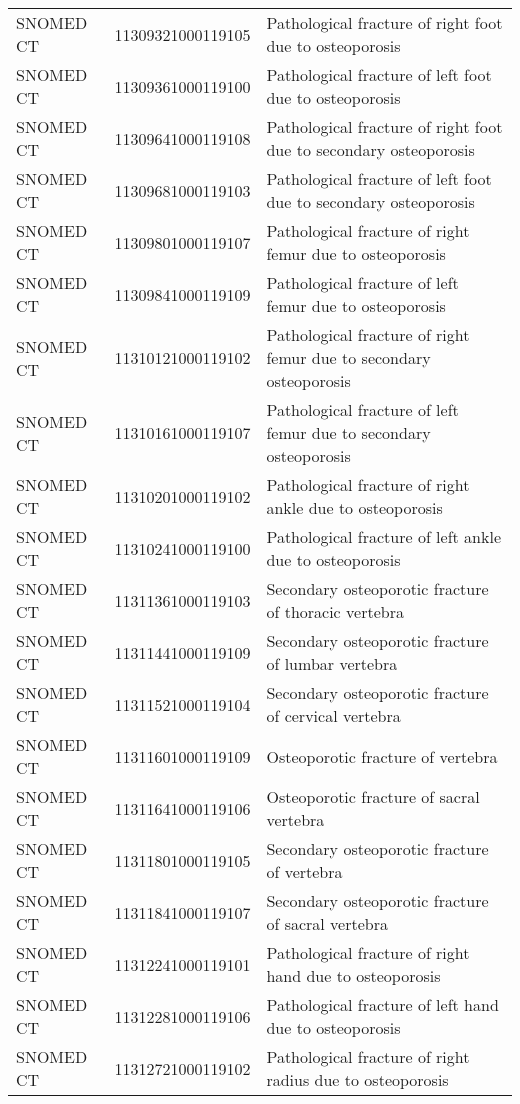 \begin{longtable}{p{}p{}p{}}
  SNOMED CT & 11309321000119105 & Pathological fracture of right foot due to osteoporosis \\ 
  SNOMED CT & 11309361000119100 & Pathological fracture of left foot due to osteoporosis \\ 
  SNOMED CT & 11309641000119108 & Pathological fracture of right foot due to secondary osteoporosis \\ 
  SNOMED CT & 11309681000119103 & Pathological fracture of left foot due to secondary osteoporosis \\ 
  SNOMED CT & 11309801000119107 & Pathological fracture of right femur due to osteoporosis \\ 
  SNOMED CT & 11309841000119109 & Pathological fracture of left femur due to osteoporosis \\ 
  SNOMED CT & 11310121000119102 & Pathological fracture of right femur due to secondary osteoporosis \\ 
  SNOMED CT & 11310161000119107 & Pathological fracture of left femur due to secondary osteoporosis \\ 
  SNOMED CT & 11310201000119102 & Pathological fracture of right ankle due to osteoporosis \\ 
  SNOMED CT & 11310241000119100 & Pathological fracture of left ankle due to osteoporosis \\ 
  SNOMED CT & 11311361000119103 & Secondary osteoporotic fracture of thoracic vertebra \\ 
  SNOMED CT & 11311441000119109 & Secondary osteoporotic fracture of lumbar vertebra \\ 
  SNOMED CT & 11311521000119104 & Secondary osteoporotic fracture of cervical vertebra \\ 
  SNOMED CT & 11311601000119109 & Osteoporotic fracture of vertebra \\ 
  SNOMED CT & 11311641000119106 & Osteoporotic fracture of sacral vertebra \\ 
  SNOMED CT & 11311801000119105 & Secondary osteoporotic fracture of vertebra \\ 
  SNOMED CT & 11311841000119107 & Secondary osteoporotic fracture of sacral vertebra \\ 
  SNOMED CT & 11312241000119101 & Pathological fracture of right hand due to osteoporosis \\ 
  SNOMED CT & 11312281000119106 & Pathological fracture of left hand due to osteoporosis \\ 
  SNOMED CT & 11312721000119102 & Pathological fracture of right radius due to osteoporosis \\ 

\end{longtable}
